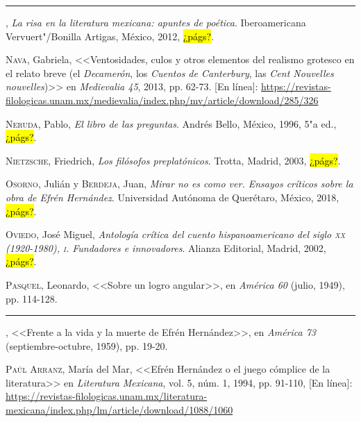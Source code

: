 \documentclass[14pt,twoside,final]{extbook} %
\begin{document}
\rule{1cm}{0.4pt}, \emph{La risa en la literatura mexicana: apuntes de poética}. Iberoamericana Vervuert"/Bonilla Artigas, México, 2012, \hl{¿págs?}.\label{bib:munguia2012}

\textsc{Nava}, Gabriela, <<Ventosidades, culos y otros elementos del realismo grotesco en el relato breve (el \emph{Decamerón}, los \emph{Cuentos de Canterbury}, las \emph{Cent Nouvelles nouvelles})>> en \emph{Medievalia 45}, 2013, pp. 62-73. [En línea]: \url{https://revistas-filologicas.unam.mx/medievalia/index.php/mv/article/download/285/326}\label{bib:nava2013}

\textsc{Neruda}, Pablo, \emph{El libro de las preguntas}. Andrés Bello, México, 1996, 5"a ed., \hl{¿págs?}.\label{bib:neruda1996}

\textsc{Nietzsche}, Friedrich, \emph{Los filósofos preplatónicos}. Trotta, Madrid, 2003, \hl{¿págs?}.\label{bib:nietzche2003}

\textsc{Osorno}, Julián y \textsc{Berdeja}, Juan, \emph{Mirar no es como ver. Ensayos críticos sobre la obra de Efrén Hernández}. Universidad Autónoma de Querétaro, México, 2018, \hl{¿págs?}.\label{bib:osorno2018}

\textsc{Oviedo}, José Miguel, \emph{Antología crítica del cuento hispanoamericano del siglo \textsc{xx} (1920-1980), \textsc{i}. Fundadores e innovadores}. Alianza Editorial, Madrid, 2002, \hl{¿págs?}.\label{bib:oviedo2002}

\textsc{Pasquel}, Leonardo, <<Sobre un logro angular>>, en \emph{América 60} (julio, 1949), pp. 114-128.\label{bib:pasquel1949}

\rule{1cm}{0.4pt}, <<Frente a la vida y la muerte de Efrén Hernández>>, en \emph{América 73} (septiembre-octubre, 1959), pp. 19-20.\label{bib:pasquel1959}

\textsc{Paúl Arranz}, María del Mar, <<Efrén Hernández o el juego cómplice de la literatura>> en \emph{Literatura Mexicana}, vol. 5, núm. 1, 1994, pp. 91-110, [En línea]: \url{https://revistas-filologicas.unam.mx/literatura-mexicana/index.php/lm/article/download/1088/1060}\label{bib:paul1994}
\end{document}
